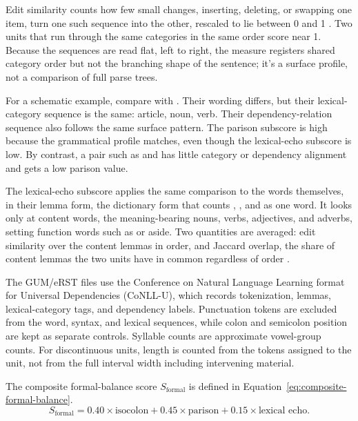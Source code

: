\documentclass[12pt]{article}
\begin{document}
Edit similarity counts how few small changes, inserting, deleting, or
swapping one item, turn one such sequence into the other, rescaled to lie
between 0 and 1 \citep{levenshtein1966BinaryCodes}. Two units that run
through the same categories in the same order score near 1.
Because the sequences are read flat, left to right, the measure registers
shared category order but not the branching shape of the sentence; it's a
surface profile, not a comparison of full parse trees.

For a schematic example, compare  with
. Their wording differs, but their lexical-category
sequence is the same: article, noun, verb. Their dependency-relation
sequence also follows the same surface pattern. The parison subscore is
high because the grammatical profile matches, even though the lexical-echo
subscore is low. By contrast, a pair such as  and
 has little category or dependency alignment and
gets a low parison value.

The lexical-echo subscore applies the same comparison to the words
themselves, in their lemma form, the dictionary form that counts
, , and  as one word. It looks
only at content words, the meaning-bearing nouns, verbs, adjectives, and
adverbs, setting function words such as  or 
aside. Two quantities are averaged: edit similarity over the content lemmas
in order, and Jaccard overlap, the share of content lemmas the two units
have in common regardless of order \citep{jaccard1901EtudeComparative}.

The GUM/eRST files use the Conference on Natural Language Learning format
for Universal Dependencies (CoNLL-U), which records tokenization, lemmas,
lexical-category tags, and dependency labels. Punctuation tokens are
excluded from the word, syntax, and lexical sequences, while colon and
semicolon position are kept as separate controls. Syllable counts are
approximate vowel-group counts. For discontinuous units, length is counted
from the tokens assigned to the unit, not from the full interval width
including intervening material.

The composite formal-balance score \(S_{\mathrm{formal}}\) is defined in
Equation~\ref{eq:composite-formal-balance}.
\begin{equation}
\label{eq:composite-formal-balance}
S_{\mathrm{formal}} =
0.40 \times \text{isocolon} +
0.45 \times \text{parison} +
0.15 \times \text{lexical echo}.
\end{equation}
\end{document}
